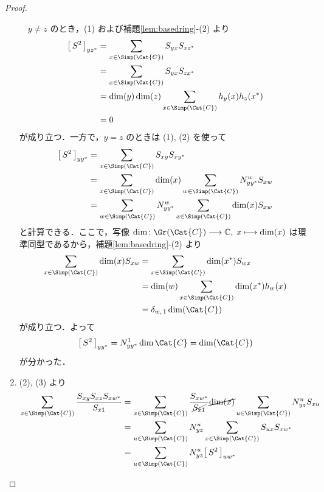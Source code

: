 \documentclass[TQFT_main]{subfiles}
\begin{document}
\begin{proof}
\begin{enumerate}
        　$y \neq z$ のとき，(1) および補題\ref{lem:basedring}-(2) より
        \begin{align}
            \bigl[\, S^2 \,\bigr]_{yz^*}
            &= \sum_{x \in \Simp(\Cat{C})} S_{yx} S_{xz^{*}} \\
            &= \sum_{x \in \Simp(\Cat{C})} S_{yx} S_{zx^*} \\
            &= \dim (y) \dim (z)\sum_{x \in \Simp(\Cat{C})} h_y(x) h_z (x^*) \\
            &= 0
        \end{align}
        が成り立つ．一方で，$y = z$ のときは (1), (2) を使って
        \begin{align}
            \bigl[\, S^2 \,\bigr]_{yy^*}
            &= \sum_{x \in \Simp(\Cat{C})} S_{xy} S_{xy^{*}} \\
            &= \sum_{x \in \Simp(\Cat{C})} \dim(x) \sum_{w \in \Simp(\Cat{C})} N^w_{yy^*} S_{xw} \\
            &= \sum_{w \in \Simp(\Cat{C})} N^w_{yy^*} \sum_{x \in \Simp(\Cat{C})} \dim(x) S_{xw}
        \end{align}
        と計算できる．ここで，写像 $\dim \colon \Gr(\Cat{C}) \lto \mathbb{C},\; x \lmto \dim (x)$ は環準同型であるから，補題\ref{lem:basedring}-(2) より
        \begin{align}
            \sum_{x \in \Simp(\Cat{C})} \dim(x) S_{xw}
            &= \sum_{x \in \Simp(\Cat{C})} \dim(x^*) S_{wx} \\
            &= \dim(w)\sum_{x \in \Simp(\Cat{C})} \dim(x^*) h_w(x) \\
            &= \delta_{w,\, 1} \dim(\Cat{C}) \label{eq:dim-S}
        \end{align}
        が成り立つ．よって
        \begin{align}
            \bigl[\, S^2 \,\bigr]_{yy^*} = N^1_{yy^*} \dim \Cat{C} = \dim (\Cat{C})
        \end{align}
        が分かった．
        \item (2), (3) より
        \begin{align}
            \sum_{x \in \Simp(\Cat{C})} \frac{S_{xy} S_{xz} S_{xw^*}}{S_{x1}} 
            &= \sum_{x \in \Simp(\Cat{C})} \frac{S_{xw^*}}{\cancel{S_{x1}}} \cancel{\dim (x)} \sum_{u \in \Simp(\Cat{C})} N^u_{yz} S_{xu} \\
            &= \sum_{u \in \Simp(\Cat{C})} N^u_{yz} \sum_{x \in \Simp(\Cat{C})} S_{ux} S_{xw^*} \\
            &= \sum_{u \in \Simp(\Cat{C})} N^u_{yz} \bigl[\, S^2 \,\bigr]_{uw^*} \\

\end{align}
\end{enumerate}
\end{proof}
\end{document}
